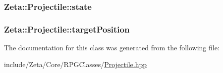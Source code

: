 \hypertarget{classZeta_1_1Projectile_ac6c490114f270934af7728c905d8b9fe}{
\subsubsection[{state}]{ Zeta\+::\+Projectile\+::state\hspace{0.3cm}{\ttfamily [protected]}}}\label{classZeta_1_1Projectile_ac6c490114f270934af7728c905d8b9fe}
\hypertarget{classZeta_1_1Projectile_ac3e3496cf0700e62f7f3d54b782e07e1}{
\subsubsection[{target\+Position}]{ Zeta\+::\+Projectile\+::target\+Position\hspace{0.3cm}{\ttfamily [protected]}}}\label{classZeta_1_1Projectile_ac3e3496cf0700e62f7f3d54b782e07e1}


The documentation for this class was generated from the following file\+:\begin{DoxyCompactItemize}
\item 
include/\+Zeta/\+Core/\+R\+P\+G\+Classes/\hyperlink{Projectile_8hpp}{Projectile.\+hpp}\end{DoxyCompactItemize}
